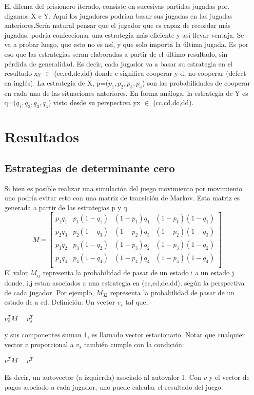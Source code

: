 \documentclass[12pt]{article}
\begin{document}
El dilema del prisionero iterado, consiste en sucesivas partidas jugadas por, digamos X e Y.
Aquí los jugadores podrían basar sus jugadas en las jugadas anteriores.Sería natural pensar que el jugador que es
capaz de recordar más jugadas, podría confeccionar una estrategia más eficiente y así llevar ventaja.
Se va a probar luego, que esto no es así, y que solo importa la última jugada. Es por eso que las estrategias seran elaboradas
a partir de el último resultado, sin pérdida de generalidad.
Es decir, cada jugador va a basar su estrategia en el resultado xy $\in$ (cc,cd,dc,dd) donde c significa cooperar y d, no cooperar 
(defect en inglés). La estrategia de X, p=($p_1,p_2,p_3,p_4$) son las probabilidades de cooperar en cada una de las situaciones 
anteriores. En forma análoga, la estrategia de Y es q=($q_1,q_2,q_3,q_4$) visto desde su perspectiva yx $\in$ (cc,cd,dc,dd).

\section{Resultados}
\subsection{Estrategias de determinante cero}
Si bien es posible realizar una simulación del juego movimiento por movimiento uno podría evitar esto con una matriz
de transición de Markov. Esta matriz es generada a partir de las estrategias p y q.
$$M=
\begin{bmatrix}
 p_1 q_1 &p_1(1-q_1) &(1-p_1)q_1 &(1-p_1)(1-q_1)\\
 p_2 q_3 &p_2(1-q_3) &(1-p_2)q_3 &(1-p_2)(1-q_3)\\
 p_3 q_2 &p_3(1-q_2) &(1-p_3)q_2 &(1-p_3)(1-q_2)\\
 p_4 q_4 &p_4(1-q_4) &(1-p_4)q_4 &(1-p_4)(1-q_4)\\
\end{bmatrix}
$$
El valor $M_{ij}$ representa la probabilidad de pasar de un estado i a un estado j donde, i,j estan asociados a una 
estrategia en (cc,cd,dc,dd), según la perspectiva de cada jugador.
Por ejemplo, $M_{32}$ representa la probabilidad de pasar de un estado dc a cd.\newline
Definición: Un vector $v_s$ tal que,
\begin{center}
$v_s^T M = v_s^T$
\end{center}
y sus componentes suman 1, es llamado  vector estacionario.\newline
Notar que cualquier vector $v$ proporcional a $v_s$ también cumple con la condición:
\begin{center}
$v^T M = v^T$
\end{center}
Es decir, un autovector (a izquierda) asociado al autovalor 1.
Con $v$ y el vector de pagos asociado a cada jugador, uno puede calcular el resultado del juego.
\end{document}
